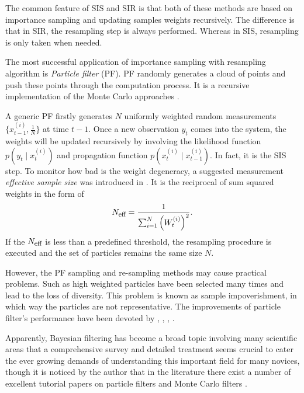 The common feature of SIS and SIR is that both of these methods are based on importance sampling and updating samples weights recursively. The difference is that in SIR, the resampling step is always performed. Whereas in SIS, resampling is only taken when needed. 


The most successful application of importance sampling with resampling algorithm is \textit{Particle filter} (PF). PF randomly generates a cloud of points and push these points through the computation process. It is a recursive implementation of the Monte Carlo approaches \cite{doucet2009tutorial}. 


A generic PF firstly generates $N$ uniformly weighted random measurements $\{x_{t-1}^{(i)},\frac{1}{N} \}$ at time $t-1$. Once a new observation $y_t$ comes into the system, the weights will be updated recursively by involving the likelihood function $p(y_t\mid x_t^{(i)})$ and propagation function $p(x_t^{(i)}\mid x_{t-1}^{(i)})$. In fact, it is the SIS step. To monitor how bad is the weight degeneracy, a suggested measurement \textit{effective sample size} was introduced in \cite{kong1994sequential}. It is the reciprocal of sum squared weights in the form of 
\begin{equation*}
N_{\mbox{\footnotesize eff}} = \frac{1}{\sum_{i=1}^{N}\left(W_t^{(i)} \right)^2}. 
\end{equation*}
If the $N_{\mbox{\footnotesize eff}}$ is less than a predefined threshold, the resampling procedure is executed and the set of particles remains the same size $N$. 



However, the PF sampling and re-sampling methods may cause practical problems. Such as high weighted particles have been selected many times and lead to the loss of diversity. This problem is known as sample impoverishment, in which way the particles are not representative. The improvements of particle filter's performance have been devoted by \cite{carpenter1999improved}, \cite{godsill2001maximum}, \cite{stavropoulos2001improved}, \cite{smcmip2011}. 


Apparently, Bayesian filtering has become a broad topic involving many scientific areas that a comprehensive survey and detailed treatment seems crucial to cater the ever growing demands of understanding this important field for many novices, though it is noticed by the author that in the literature there exist a number of excellent tutorial papers on particle filters and Monte Carlo filters \cite{chen2003bayesian} \cite{doucet2000sequential} \cite{doucet2000rao} \cite{chen2012monte}.  
 



